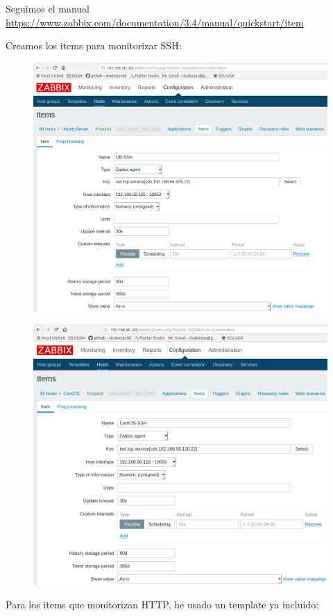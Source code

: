 \documentclass{article}
\begin{document}
Seguimos el manual \url{https://www.zabbix.com/documentation/3.4/manual/quickstart/item}

Creamos los items para monitorizar SSH:

\begin{figure}[H]
  \centering
  \includegraphics[width=120mm]{screenshots/item_us-ssh}
\end{figure}

\begin{figure}[H]
  \centering
  \includegraphics[width=120mm]{screenshots/item_centos-ssh}
\end{figure}

Para los items que monitorizan HTTP, he usado un template ya incluido:
\end{document}

